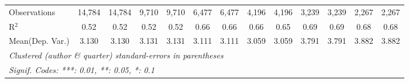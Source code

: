 \begin{tabular}{lcccccccccccc}
   Observations                             & 14,784       & 14,784         & 9,710        & 9,710          & 6,477   & 6,477        & 4,196       & 4,196   & 3,239   & 3,239         & 2,267   & 2,267\\  
   R$^2$                                    & 0.52         & 0.52           & 0.52         & 0.52           & 0.66    & 0.66         & 0.66        & 0.65    & 0.69    & 0.69          & 0.68    & 0.68\\  
Mean(Dep. Var.) & 3.130 & 3.130 & 3.131 & 3.131 & 3.111 & 3.111 & 3.059 & 3.059 & 3.791 & 3.791 & 3.882 & 3.882 \\
   \midrule \midrule
   \multicolumn{13}{l}{\emph{Clustered (author \& quarter) standard-errors in parentheses}}\\
   \multicolumn{13}{l}{\emph{Signif. Codes: ***: 0.01, **: 0.05, *: 0.1}}\\
\end{tabular}
\par\endgroup
